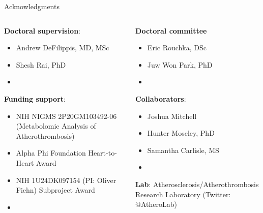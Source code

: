 \documentclass[xcolor=dvipsnames]{beamer}
\begin{document}
\begin{frame}{Acknowledgments}
	\begin{columns}
		\begin{column}{0.5\textwidth}
			\textbf{Doctoral supervision}:
			\begin{itemize}
				\item Andrew DeFilippis, MD, MSc
				\item Shesh Rai, PhD
				\item[]
			\end{itemize}
			\textbf{Funding support}:
			\begin{itemize}
				\item NIH NIGMS 2P20GM103492-06 (Metabolomic Analysis of Atherothrombosis)
				\item Alpha Phi Foundation Heart-to-Heart Award
				\item NIH 1U24DK097154 (PI: Oliver Fiehn) Subproject Award
				\item[]
			\end{itemize}
		\end{column}
		\vspace{-25.5pt}
		\begin{column}{0.5\textwidth}
			\textbf{Doctoral committee }
			\begin{itemize}
				\item Eric Rouchka, DSc
				\item Juw Won Park, PhD
				\item[]
			\end{itemize}
			\textbf{Collaborators}:
			\begin{itemize}
				\item Joshua Mitchell 
				\item Hunter Moseley, PhD
				\item Samantha Carlisle, MS
				\item[]
			\end{itemize}
			\textbf{Lab}: Atherosclerosis/Atherothrombosis Research Laboratory (Twitter: @AtheroLab)
		\end{column}
	\end{columns}
\end{frame}
\end{document}
